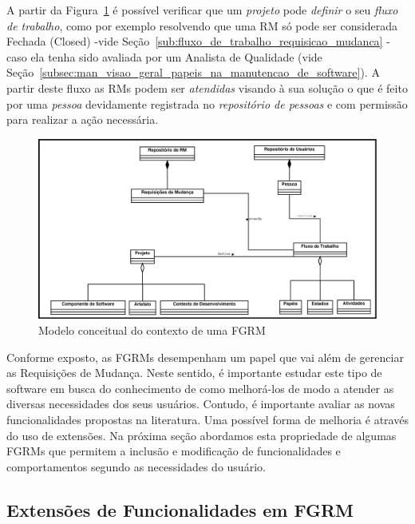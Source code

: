 A partir da Figura~\ref{fig:diagrama-classe-conceitual-fgrm} é possível
verificar que um \textit{projeto} pode \textit{definir} o seu \textit{fluxo de
    trabalho}, como por exemplo resolvendo que uma RM só pode ser considerada
Fechada (Closed) \@-\@ vide Seção~\ref{sub:fluxo_de_trabalho_requisicao_mudanca}
\@-\@ caso ela tenha sido avaliada por um Analista de Qualidade (vide
Seção~\ref{subsec:man_visao_geral_papeis_na_manutencao_de_software}). A partir
deste fluxo as RMs podem ser \textit{atendidas} visando à sua solução o que é
feito por uma \textit{pessoa} devidamente registrada no \textit{repositório de
    pessoas} e com permissão para realizar a ação necessária.

\begin{figure}[htpb] \centering
	\includegraphics[width=1.15\linewidth]{./chapter-manutencao-software-visao-geral/img/diagrama-classe-conceitual-fgrm.pdf}
	\caption{Modelo conceitual do contexto de uma FGRM}
\label{fig:diagrama-classe-conceitual-fgrm}
\end{figure}

Conforme exposto, as FGRMs desempenham um papel que vai além de gerenciar as
Requisições de Mudança. Neste sentido, é importante estudar este tipo de
software em busca do conhecimento de como melhorá-los de modo a atender as
diversas necessidades dos seus usuários. Contudo, é importante avaliar as novas
funcionalidades propostas na li\-te\-ra\-tu\-ra. Uma possível forma de melhoria
é através do uso de extensões. Na próxima seção abordamos esta propriedade de
algumas FGRMs que permitem a inclusão e modificação de funcionalidades e
comportamentos segundo as necessidades do usuário.

\subsection{Extensões de Funcionalidades em FGRM}
\label{subsec:manutencao_visao_geral_extensoes_fgrm}

